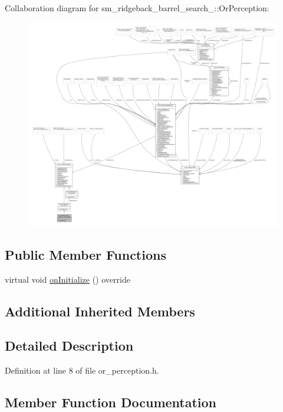 Collaboration diagram for sm\+\_\+ridgeback\+\_\+barrel\+\_\+search\+\_\+:\+:Or\+Perception\+:
\nopagebreak
\begin{figure}[H]
\begin{center}
\leavevmode
\includegraphics[width=350pt]{classsm__ridgeback__barrel__search__1_1_1OrPerception__coll__graph}
\end{center}
\end{figure}
\subsection*{Public Member Functions}
\begin{DoxyCompactItemize}
\item 
virtual void \hyperlink{classsm__ridgeback__barrel__search__1_1_1OrPerception_a69b72b364fb870307aede253560d32e5}{on\+Initialize} () override
\end{DoxyCompactItemize}
\subsection*{Additional Inherited Members}


\subsection{Detailed Description}


Definition at line 8 of file or\+\_\+perception.\+h.



\subsection{Member Function Documentation}
\mbox{\label{classsm__ridgeback__barrel__search__1_1_1OrPerception_a69b72b364fb870307aede253560d32e5}} 
